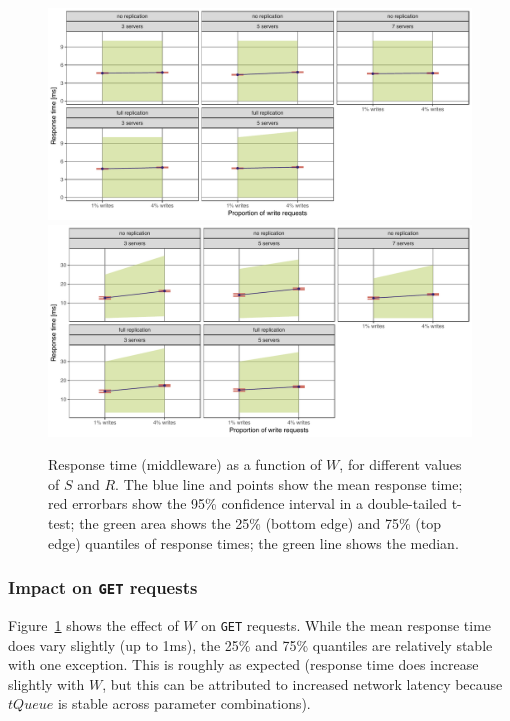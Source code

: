\documentclass[11pt]{article}
\newcommand{\get}[0]{\texttt{GET}}
\begin{document}
\begin{figure}[p]
\centering
\includegraphics[width=\textwidth]{../results/writes/graphs/response_time_vs_writes_get.pdf}
\includegraphics[width=\textwidth]{../results/writes/graphs/response_time_vs_writes_set.pdf}
\caption{Response time (middleware) as a function of $W$, for different values of $S$ and $R$. The blue line and points show the mean response time; red errorbars show the 95\% confidence interval in a double-tailed t-test; the green area shows the 25\% (bottom edge) and 75\% (top edge) quantiles of response times; the green line shows the median.}
\label{fig:exp3:res:responsetime}
\end{figure}

\subsubsection{Impact on \get{} requests}

Figure~\ref{fig:exp3:res:responsetime} shows the effect of $W$ on \get{} requests. While the mean response time does vary slightly (up to 1ms), the 25\% and 75\% quantiles are relatively stable with one exception. This is roughly as expected (response time does increase slightly with $W$, but this can be attributed to increased network latency because $tQueue$ is stable across parameter combinations).
\end{document}
